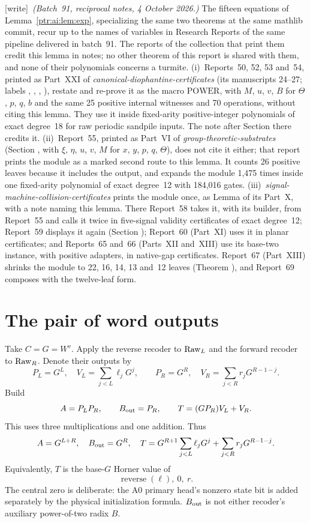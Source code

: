 \documentclass[11pt,letterpaper]{article}
\theoremstyle{definition}\newtheorem{definition}[theorem]{Definition}
\theoremstyle{remark}\newtheorem{remark}[theorem]{Remark}
\newcommand{\wtag}{\textup{[write]}}
\begin{document}
{\small\wtag\ \emph{(Batch~91, reciprocal notes, 4 October 2026.)} The fifteen equations of Lemma~\ref{ptr:ai:lem:exp}, specializing the same two theorems at the same mathlib commit, recur up to the names of variables in Research Reports of the same pipeline delivered in batch~91. The reports of the collection that print them credit this lemma in notes; no other theorem of this report is shared with them, and none of their polynomials concerns a turmite.
(i)~Reports~50, 52, 53 and~54, printed as Part~XXI of \emph{canonical-diophantine-certificates} (its manuscripts 24--27; labels , , , ), restate and re-prove it as the macro $\mathrm{POWER}$, with $M$, $u$, $v$, $B$ for $\Theta$, $p$, $q$, $b$ and the same 25 positive internal witnesses and 70 operations, without citing this lemma. They use it inside fixed-arity positive-integer polynomials of exact degree~18 for raw periodic sandpile inputs. The note after Section  there credits it.
(ii)~Report~55, printed as Part~VI of \emph{group-theoretic-substrates} (Section , with $\xi$, $\eta$, $u$, $v$, $M$ for $x$, $y$, $p$, $q$, $\Theta$), does not cite it either; that report prints the module as a marked second route to this lemma. It counts 26 positive leaves because it includes the output, and expands the module 1,475 times inside one fixed-arity polynomial of exact degree~12 with 184,016 gates.
(iii)~\emph{signal-machine-collision-certificates} prints the module once, as Lemma  of its Part~X, with a note naming this lemma. There Report~58 takes it, with its builder, from Report~55 and calls it twice in five-signal validity certificates of exact degree~12; Report~59 displays it again (Section ); Report~60 (Part~XI) uses it in planar certificates; and Reports~65 and~66 (Parts~XII and~XIII) use its base-two instance, with positive adapters, in native-gap certificates. Report~67 (Part~XIII) shrinks the module to 22, 16, 14, 13 and~12 leaves (Theorem ), and Report~69 composes with the twelve-leaf form.\par}

\section{The pair of word outputs}\label{ptr:ai:sec:pair}
Take $C=G=W^v$. Apply the reverse recoder to $\mathrm{Raw}_L$ and the forward recoder to $\mathrm{Raw}_R$. Denote their outputs by
\[
 P_L=G^L,\quad V_L=\sum_{j<L}\ell_jG^j,
 \qquad P_R=G^R,\quad V_R=\sum_{j<R}r_jG^{R-1-j}.
\]
Build
\begin{equation}\label{ptr:ai:eq:pair}
 A=P_LP_R,\qquad B_{\rm out}=P_R,\qquad
 T=(GP_R)V_L+V_R.
\end{equation}
This uses three multiplications and one addition. Thus
\[
 A=G^{L+R},\quad B_{\rm out}=G^R,\quad
 T=G^{R+1}\sum_{j<L}\ell_jG^j+\sum_{j<R}r_jG^{R-1-j}.
\]
Equivalently, $T$ is the base-$G$ Horner value of
\[
 \operatorname{reverse}(\ell),\ 0,\ r.
\]
The central zero is deliberate: the A0 primary head's nonzero state bit is added separately by the physical initialization formula. $B_{\rm out}$ is not either recoder's auxiliary power-of-two radix $B$.
\end{document}
